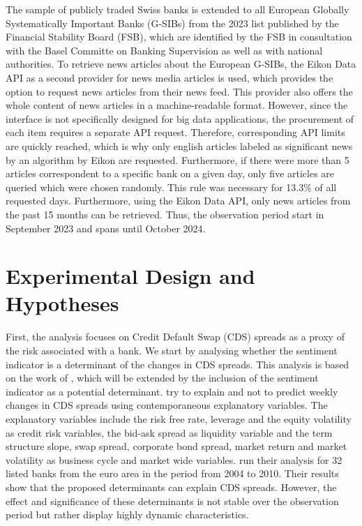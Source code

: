 The sample of publicly traded Swiss banks is extended to all European Globally Systematically Important Banks (G-SIBs) from the 2023 list published by the Financial Stability Board (FSB), which are identified by the FSB in consultation with the Basel Committe on Banking Supervision as well as with national authorities. To retrieve news articles about the European G-SIBs, the Eikon Data API as a second provider for news media articles is used, which provides the option to request news articles from their news feed. This provider also offers the whole content of news articles in a machine-readable format. However, since the interface is not specifically designed for big data applications, the procurement of each item requires a separate API request. Therefore, corresponding API limits are quickly reached, which is why only english articles labeled as significant news by an algorithm by Eikon are requested. Furthermore, if there were more than 5 articles correspondent to a specific bank on a given day, only five articles are queried which were chosen randomly. This rule was necessary for 13.3\% of all requested days. Furthermore, using the Eikon Data API, only news articles from the past 15 months can be retrieved. Thus, the observation period start in September 2023 and spans until October 2024.

\section{Experimental Design and Hypotheses} \label{sec:hypotheses}

First, the analysis focuses on Credit Default Swap (CDS) spreads as a proxy of the risk associated with a bank. We start by analysing whether the sentiment indicator is a determinant of the changes in CDS spreads. This analysis is based on the work of \cite{annaert2013}, which will be extended by the inclusion of the sentiment indicator as a potential determinant. \cite{annaert2013} try to explain and not to predict weekly changes in CDS spreads using contemporaneous explanatory variables. The explanatory variables include the risk free rate, leverage and the equity volatility as credit risk variables, the bid-ask spread as liquidity variable and the term structure slope, swap spread, corporate bond spread, market return and market volatility as business cycle and market wide variables. %
\cite{annaert2013} run their analysis for 32 listed banks from the euro area in the period from 2004 to 2010. Their results show that the proposed determinants can explain CDS spreads. However, the effect and significance of these determinants is not stable over the observation period but rather display highly dynamic characteristics. \\		

